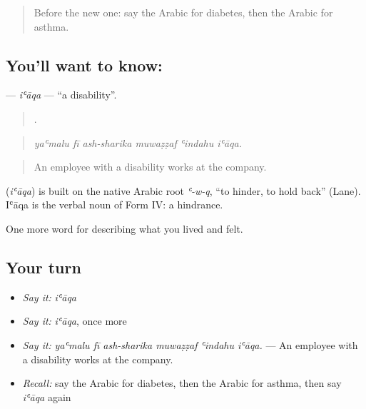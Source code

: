 \label{lesson:AR-C513-iaqa}



\begin{quote}
Before the new one: say the Arabic for diabetes, then the Arabic for asthma.
\end{quote}

\subsection*{You'll want to know: }
\textbf{} — \emph{iʿāqa} — \textquotedblleft{}a disability\textquotedblright{}.

\begin{quote}
     .
\end{quote}

\begin{quote}
\emph{yaʿmalu fī ash-sharika muwaẓẓaf ʿindahu iʿāqa.}
\end{quote}

\begin{quote}
An employee with a disability works at the company.
\end{quote}

\begin{cousinweb}
\textbf{} (\emph{iʿāqa}) is built on the native Arabic root \emph{ʿ-w-q}, \textquotedblleft{}to hinder, to hold back\textquotedblright{} (Lane). Iʿāqa is the verbal noun of Form IV: a hindrance.
\end{cousinweb}

\begin{grammarlens}[title={What you've built}]
One more word for describing what you lived and felt.
\end{grammarlens}

\subsection*{Your turn}
\begin{itemize}
\raggedright
  \item \emph{Say it:} \emph{iʿāqa}
  \item \emph{Say it:} \emph{iʿāqa}, once more
  \item \emph{Say it:} \emph{yaʿmalu fī ash-sharika muwaẓẓaf ʿindahu iʿāqa.} — An employee with a disability works at the company.
  \item \emph{Recall:} say the Arabic for diabetes, then the Arabic for asthma, then say \emph{iʿāqa} again
\end{itemize}

